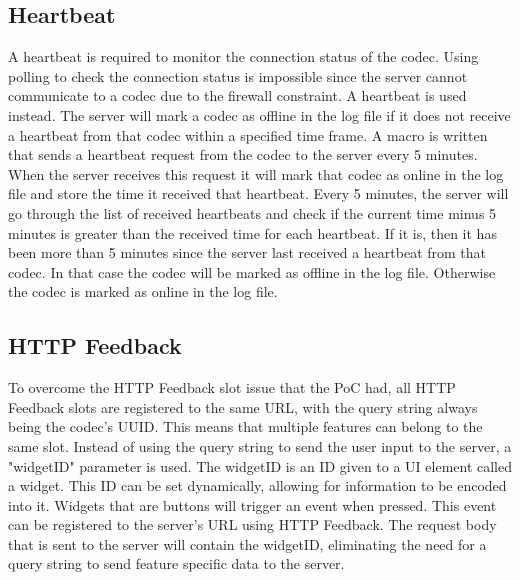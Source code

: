 \documentclass[letterpaper,12pt]{article}
\begin{document}
\subsection{Heartbeat}
A heartbeat is required to monitor the connection status of the codec. Using polling to check the connection status is impossible since the server cannot communicate to a codec due to the firewall constraint. A heartbeat is used instead. The server will mark a codec as offline in the log file if it does not receive a heartbeat from that codec within a specified time frame.
A macro is written that sends a heartbeat request from the codec to the server every 5 minutes. When the server receives this request it will mark that codec as online in the log file and store the time it received that heartbeat. Every 5 minutes, the server will go through the list of received heartbeats and check if the current time minus 5 minutes is greater than the received time for each heartbeat. If it is, then it has been more than 5 minutes since the server last received a heartbeat from that codec. In that case the codec will be marked as offline in the log file. Otherwise the codec is marked as online in the log file.

\subsection{HTTP Feedback}
To overcome the HTTP Feedback slot issue that the PoC had, all HTTP Feedback slots are registered to the same URL, with the query string always being the codec's UUID. This means that multiple features can belong to the same slot. Instead of using the query string to send the user input to the server, a "widgetID" parameter is used. The widgetID is an ID given to a UI element called a widget. This ID can be set dynamically, allowing for information to be encoded into it. Widgets that are buttons will trigger an event when pressed. This event can be registered to the server's URL using HTTP Feedback. The request body that is sent to the server will contain the widgetID, eliminating the need for a query string to send feature specific data to the server. 
\end{document}
